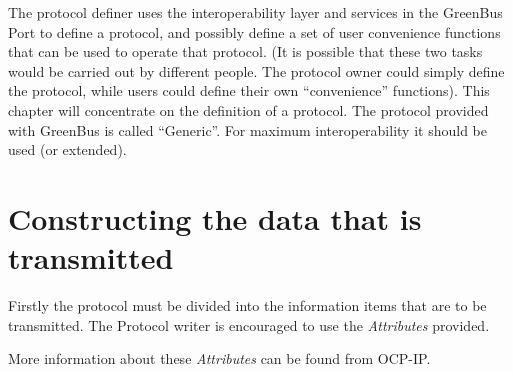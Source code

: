 \documentclass[12pt,oneside]{gsbook}
\newcommand{\quarks}{{\em Attributes}\xspace}
\begin{document}
The protocol definer uses the interoperability layer and services in
the GreenBus Port to define a protocol, and
possibly define a set of user convenience functions that can be used to operate
that protocol. (It is possible that these two tasks would be carried out by
different people. The protocol owner could simply define the protocol, while
users could define their own ``convenience'' functions).
This chapter will concentrate on the definition of a protocol. The
protocol provided with GreenBus is called ``Generic''. For maximum
interoperability it should be used (or extended).

\section{ Constructing the data that is transmitted }

Firstly the protocol must be divided into the information items that are to be
transmitted. The Protocol writer is encouraged to use the \quarks provided.

More information about these \quarks can be found from OCP-IP.
\end{document}

